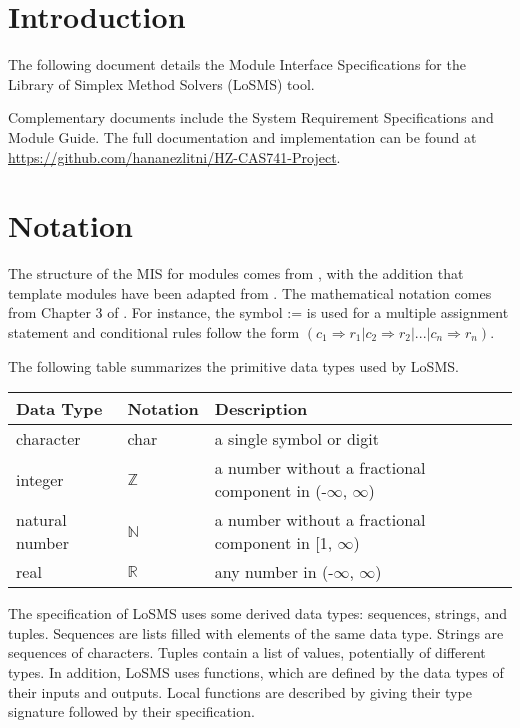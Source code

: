 \documentclass[12pt, titlepage]{article}
\newcommand{\progname}{Library of Simplex Method Solvers}
\newcommand{\famname}{LoSMS}
\begin{document}
\newpage

\tableofcontents

\newpage


\section{Introduction}

The following document details the Module Interface Specifications for the 
\progname{} (\famname{}) tool.

Complementary documents include the System Requirement Specifications and 
Module Guide.  The full documentation and implementation can be found at  
\url{https://github.com/hananezlitni/HZ-CAS741-Project}.

\section{Notation}

The structure of the MIS for modules comes from \citet{HoffmanAndStrooper1995},
with the addition that template modules have been adapted from
\cite{GhezziEtAl2003}.  The mathematical notation comes from Chapter 3 of
\citet{HoffmanAndStrooper1995}.  For instance, the symbol := is used for a
multiple assignment statement and conditional rules follow the form $(c_1
\Rightarrow r_1 | c_2 \Rightarrow r_2 | ... | c_n \Rightarrow r_n )$.

The following table summarizes the primitive data types used by \famname{}. 

\begin{center}
\renewcommand{\arraystretch}{1.2}
\noindent 
\begin{tabular}{l l p{7.5cm}} 
\toprule 
\textbf{Data Type} & \textbf{Notation} & \textbf{Description}\\ 
\midrule
character & char & a single symbol or digit\\
integer & $\mathbb{Z}$ & a number without a fractional component in (-$\infty$, $\infty$) \\
natural number & $\mathbb{N}$ & a number without a fractional component in [1, $\infty$) \\
real & $\mathbb{R}$ & any number in (-$\infty$, $\infty$)\\
\bottomrule
\end{tabular} 
\end{center}

\noindent
The specification of \famname{} uses some derived data types: sequences, 
strings, and tuples. Sequences are lists filled with elements of the same data 
type. Strings are sequences of characters. Tuples contain a list of values, 
potentially of different types. In addition, \famname{} uses functions, which
are defined by the data types of their inputs and outputs. Local functions are
described by giving their type signature followed by their specification.
\end{document}
